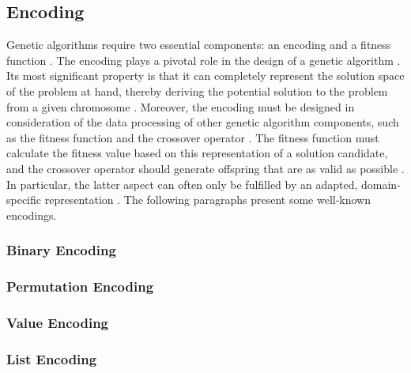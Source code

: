 \documentclass[sigconf]{acmart}
\begin{document}
\subsection{Encoding}
Genetic algorithms require two essential components: an encoding and
a fitness function \cite{Affenzeller2009}.
The encoding plays a pivotal role in the design of a genetic algorithm
\cite{Katoch2021}.
Its most significant property is that it can completely represent the solution
space of the problem at hand, thereby deriving the potential solution to the
problem from a given chromosome \cite{Affenzeller2009}.
Moreover, the encoding must be designed in consideration of the data
processing of other genetic algorithm components, such as the fitness function
and the crossover operator \cite{Affenzeller2009}.
The fitness function must calculate the fitness value based on this
representation of a solution candidate, and the crossover operator should
generate offspring that are as valid as possible \cite{Affenzeller2009}.
In particular, the latter aspect can often only be fulfilled by an adapted,
domain-specific representation \cite{Affenzeller2009}.
%
The following paragraphs present some well-known encodings.

\subsubsection{Binary Encoding}
\subsubsection{Permutation Encoding}
\subsubsection{Value Encoding}
\subsubsection{List Encoding}
\end{document}
